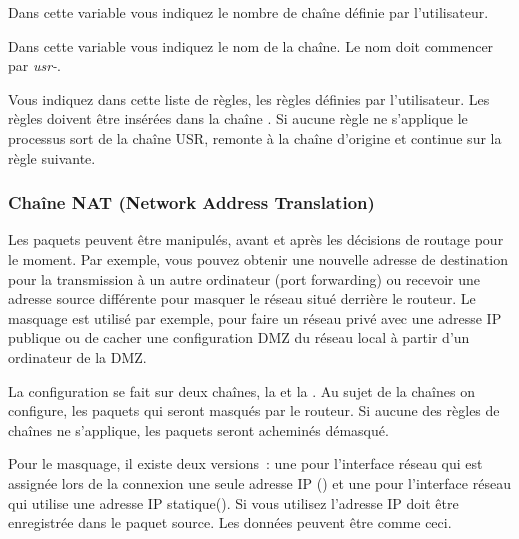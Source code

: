 \begin{description}
 Dans cette variable
vous indiquez le nombre de chaîne définie par l'utilisateur.

Dans cette variable vous indiquez le nom de la chaîne. Le nom doit commencer par
\emph{usr-}.

Vous indiquez dans cette liste de règles, les règles définies par l'utilisateur.
Les règles doivent être insérées dans la chaîne . Si aucune
règle ne s'applique le processus sort de la chaîne USR, remonte à la chaîne 
d'origine et continue sur la règle suivante.
\end{description}

\subsubsection{Chaîne NAT (Network Address Translation)}

Les paquets peuvent être manipulés, avant et après les décisions de routage
pour le moment. Par exemple, vous pouvez obtenir une nouvelle adresse de
destination pour la transmission à un autre ordinateur (port forwarding) ou
recevoir une adresse source différente pour masquer le réseau situé derrière
le routeur. Le masquage est utilisé par exemple, pour faire un réseau
privé avec une adresse IP publique ou de cacher une configuration DMZ du
réseau local à partir d'un ordinateur de la DMZ.

La configuration se fait sur deux chaînes, la  et la
. Au sujet de la chaînes  on configure,
les paquets qui seront masqués par le routeur. Si aucune des règles de chaînes
 ne s'applique, les paquets seront acheminés démasqué.

Pour le masquage, il existe deux versions~: une pour l'interface réseau qui est
assignée lors de la connexion une seule adresse IP () et
une pour l'interface réseau qui utilise une adresse IP statique().
Si vous utilisez  l'adresse IP doit être enregistrée dans le
paquet source. Les données peuvent être comme ceci.

